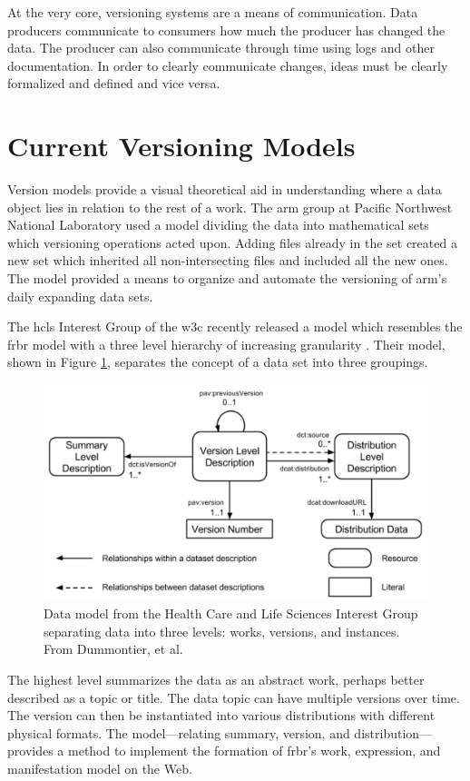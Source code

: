 At the very core, versioning systems are a means of communication.
Data producers communicate to consumers how much the producer has changed the data.
The producer can also communicate through time using logs and other documentation.
In order to clearly communicate changes, ideas must be clearly formalized and defined and vice versa.

\section{Current Versioning Models} \label{sec:models}

Version models provide a visual theoretical aid in understanding where a data object lies in relation to the rest of a work.
The \gls{arm} group at Pacific Northwest National Laboratory used a model dividing the data into mathematical sets which versioning operations acted upon\cite{6906868}.
Adding files already in the set created a new set which inherited all non-intersecting files and included all the new ones.
The model provided a means to organize and automate the versioning of \gls{arm}'s daily expanding data sets.

The \gls{hcls} Interest Group of the \gls{w3c} recently released a model which resembles the \gls{frbr} model with a three level hierarchy of increasing granularity \cite{Dummontier2016}.
Their model, shown in Figure \ref{HCLSModel}, separates the concept of a data set into three groupings.
\begin{figure}%
	\centering
	\includegraphics[scale=0.34]{figures/HCLSModel.png}
	\caption[Data model from the W3C's Health Care and Life Sciences Interest Group separating data into three levels: works, versions, and instances.]{Data model from the Health Care and Life Sciences Interest Group separating data into three levels: works, versions, and instances.  From Dummontier, et al. \cite{Dummontier2016}}
	\label{HCLSModel}
\end{figure}
The highest level summarizes the data as an abstract work, perhaps better described as a topic or title.
The data topic can have multiple versions over time.
The version can then be instantiated into various distributions with different physical formats.
The model---relating summary, version, and distribution---provides a method to implement the formation of \gls{frbr}'s work, expression, and manifestation model on the Web.

